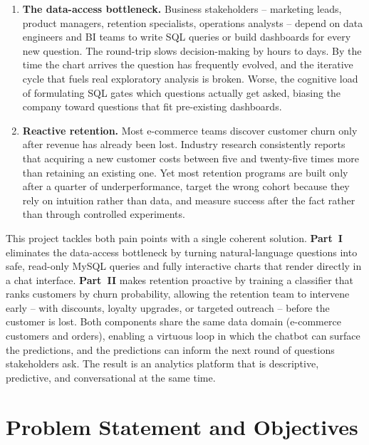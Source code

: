 \documentclass[11pt,a4paper]{article}
\begin{document}
\begin{enumerate}
  \item \textbf{The data-access bottleneck.} Business stakeholders --
    marketing leads, product managers, retention specialists,
    operations analysts -- depend on data engineers and BI teams to
    write SQL queries or build dashboards for every new question. The
    round-trip slows decision-making by hours to days. By the time the
    chart arrives the question has frequently evolved, and the
    iterative cycle that fuels real exploratory analysis is broken.
    Worse, the cognitive load of formulating SQL gates which questions
    actually get asked, biasing the company toward questions that fit
    pre-existing dashboards.
  \item \textbf{Reactive retention.} Most e-commerce teams discover
    customer churn only after revenue has already been lost. Industry
    research consistently reports that acquiring a new customer costs
    between five and twenty-five times more than retaining an existing
    one. Yet most retention programs are built only after a quarter of
    underperformance, target the wrong cohort because they rely on
    intuition rather than data, and measure success after the fact
    rather than through controlled experiments.
\end{enumerate}

This project tackles both pain points with a single coherent solution.
\textbf{Part~I} eliminates the data-access bottleneck by turning
natural-language questions into safe, read-only MySQL queries and
fully interactive charts that render directly in a chat interface.
\textbf{Part~II} makes retention proactive by training a classifier
that ranks customers by churn probability, allowing the retention team
to intervene early -- with discounts, loyalty upgrades, or targeted
outreach -- before the customer is lost. Both components share the
same data domain (e-commerce customers and orders), enabling a
virtuous loop in which the chatbot can surface the predictions, and
the predictions can inform the next round of questions stakeholders
ask. The result is an analytics platform that is descriptive,
predictive, and conversational at the same time.

\section{Problem Statement and Objectives}
\end{document}
